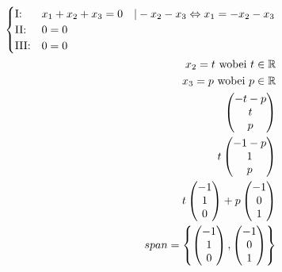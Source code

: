 \begin{align*}
    \begin{cases}
        \text{I:\@}   & x_1 + x_2 + x_3 = 0 \quad | -x_2 - x_3 \Leftrightarrow x_1 = -x_2 - x_3 \\
        \text{II:\@}  & 0 = 0                                                                   \\
        \text{III:\@} & 0 = 0
    \end{cases} \\
    x_2 = t \text{ wobei } t \in \mathbb{R}                                                 \\
    x_3 = p \text{ wobei } p \in \mathbb{R}                                                 \\
    \begin{pmatrix}
        -t -p \\ t \\ p
    \end{pmatrix}                                                                          \\
    t \begin{pmatrix}
          -1 -p \\ 1 \\ p
      \end{pmatrix}                                                                        \\
    t \begin{pmatrix}
          -1 \\ 1 \\ 0
      \end{pmatrix} + p \begin{pmatrix}
                            -1 \\ 0 \\ 1
                        \end{pmatrix}                                                      \\
    span = \left\{\begin{pmatrix}
                      -1 \\ 1 \\ 0
                  \end{pmatrix}, \begin{pmatrix}
                                     -1 \\ 0 \\ 1
                                 \end{pmatrix}\right\}
\end{align*}


